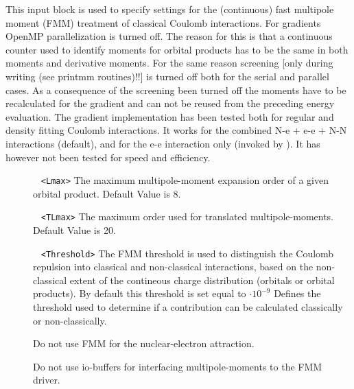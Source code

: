 This input block is used to specify settings for the (continuous) fast multipole moment (FMM) treatment of 
classical Coulomb interactions.\newline
%
%
For gradients OpenMP parallelization is turned off. The reason for this is that a continuous counter used 
to identify moments for orbital products has to be the same in both moments and derivative moments. 
For the same reason screening [only during writing (see printmm routines)!!] is turned off both for the serial 
and parallel cases. As a consequence of the screening been turned off the moments have to be recalculated for the gradient and can not be reused from the preceding energy evaluation. 
%
%
The gradient implementation has been tested both for regular and density fitting Coulomb interactions. 
It works for the combined N-e +  e-e + N-N interactions (default), 
and for the e-e interaction only (invoked by ).
It has however not been tested for speed and efficiency.
%
\begin{description}
\item[] \verb| |\newline
\verb|<Lmax>|\newline
The maximum multipole-moment expansion order of a given orbital product. Default Value is 8.
\item[] \verb| |\newline
\verb|<TLmax>|\newline
The maximum order used for translated multipole-moments. Default Value is 20.
\item[] \verb| |\newline
\verb|<Threshold>|\newline
The FMM threshold is used to distinguish the Coulomb repulsion into classical and non-classical interactions, based on the non-classical extent of the contineous charge distribution (orbitals or orbital products). 
By default this threshold is set equal to $\cdot 10^{-9}$ 
Defines the threshold used to determine if a contribution can be calculated classically or non-classically.
\item[] Do not use FMM for the nuclear-electron attraction.
\item[] Do not use io-buffers for interfacing multipole-moments to the FMM driver.
\end{description}

